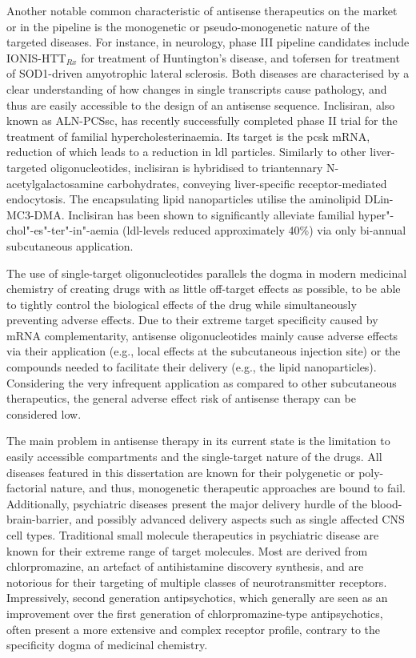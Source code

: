Another notable common characteristic of antisense therapeutics on the market or in the pipeline is the monogenetic or pseudo-monogenetic nature of the targeted diseases. For instance, in neurology, phase III pipeline candidates include IONIS-HTT$_{Rx}$ for treatment of Huntington's disease, and tofersen for treatment of SOD1-driven amyotrophic lateral sclerosis. Both diseases are characterised by a clear understanding of how changes in single transcripts cause pathology, and thus are easily accessible to the design of an antisense sequence. Inclisiran, also known as ALN-PCSsc, has recently successfully completed phase II trial for the treatment of familial hypercholesterinaemia.\cite{Raal2020} Its target is the \ac{pcsk} mRNA, reduction of which leads to a reduction in \ac{ldl} particles. Similarly to other liver-targeted oligonucleotides, inclisiran is hybridised to triantennary N-acetylgalactosamine carbohydrates, conveying liver-specific receptor-mediated endocytosis. The encapsulating lipid nanoparticles utilise the aminolipid DLin-MC3-DMA.\cite{Jayaraman2012} Inclisiran has been shown to significantly alleviate familial hyper"-chol"-es"-ter"-in"-aemia (\ac{ldl}-levels reduced approximately 40\%) via only bi-annual subcutaneous application.\cite{Frank-Kamenetsky2008,Fitzgerald2014,Fitzgerald2017,Raal2020}

The use of single-target oligonucleotides parallels the dogma in modern medicinal chemistry of creating drugs with as little off-target effects as possible, to be able to tightly control the biological effects of the drug while simultaneously preventing adverse effects. Due to their extreme target specificity caused by mRNA complementarity, antisense oligonucleotides mainly cause adverse effects via their application (e.g., local effects at the subcutaneous injection site) or the compounds needed to facilitate their delivery (e.g., the lipid nanoparticles). Considering the very infrequent application as compared to other subcutaneous therapeutics, the general adverse effect risk of antisense therapy can be considered low.\cite{Raal2020}

The main problem in antisense therapy in its current state is the limitation to easily accessible compartments and the single-target nature of the drugs. All diseases featured in this dissertation are known for their polygenetic or poly-factorial nature, and thus, monogenetic therapeutic approaches are bound to fail. Additionally, psychiatric diseases present the major delivery hurdle of the blood-brain-barrier, and possibly advanced delivery aspects such as single affected CNS cell types. Traditional small molecule therapeutics in psychiatric disease are known for their extreme range of target molecules. Most are derived from chlorpromazine, an artefact of antihistamine discovery synthesis, and are notorious for their targeting of multiple classes of neurotransmitter receptors. Impressively, second generation antipsychotics, which generally are seen as an improvement over the first generation of chlorpromazine-type antipsychotics, often present a more extensive and complex receptor profile, contrary to the specificity dogma of medicinal chemistry.

